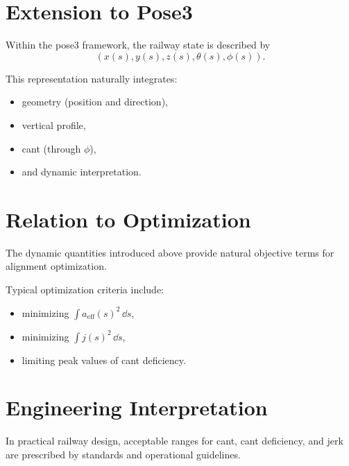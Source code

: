 \section{Extension to Pose3}

\begin{remark}
Within the pose3 framework, the railway state is described by
\[
(x(s), y(s), z(s), \theta(s), \phi(s)).
\]
\end{remark}

\begin{remark}
This representation naturally integrates:
\begin{itemize}
\item geometry (position and direction),
\item vertical profile,
\item cant (through $\phi$),
\item and dynamic interpretation.
\end{itemize}
\end{remark}

\section{Relation to Optimization}

\begin{remark}
The dynamic quantities introduced above provide natural objective terms
for alignment optimization.
\end{remark}

\begin{remark}
Typical optimization criteria include:
\begin{itemize}
\item minimizing $\int a_{\mathrm{eff}}(s)^2 \,\dd s$,
\item minimizing $\int j(s)^2 \,\dd s$,
\item limiting peak values of cant deficiency.
\end{itemize}
\end{remark}

\section{Engineering Interpretation}

\begin{remark}
In practical railway design, acceptable ranges for cant, cant deficiency,
and jerk are prescribed by standards and operational guidelines.
\end{remark}

